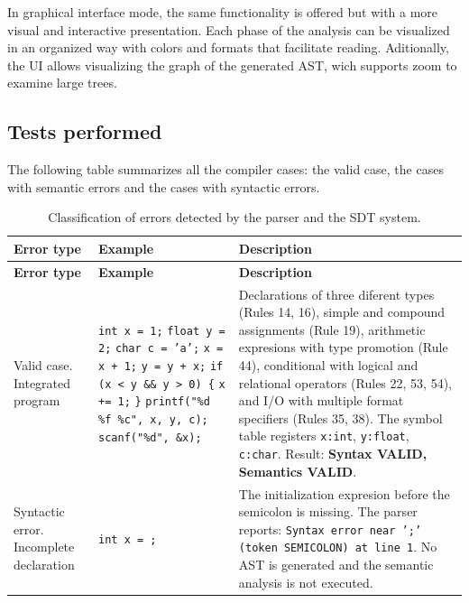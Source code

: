 \documentclass[letterpaper,12pt,oneside]{article}
\begin{document}
In graphical interface mode, the same functionality is offered but with a more visual and interactive presentation. Each phase of the analysis can be visualized in an organized way with colors and formats that facilitate reading. Aditionally, the UI allows visualizing the graph of the generated AST, wich supports zoom to examine large trees.

\subsection{Tests performed}

The following table summarizes all the compiler cases: the valid case, the cases with semantic errors and the cases with syntactic errors.

\begin{longtable}{|p{3.8cm}|p{3.5cm}|p{6.5cm}|}
\caption{Classification of errors detected by the parser and the SDT system.} \label{tab:errores} \\
\hline
\rowcolor{gray!20}
\textbf{Error type} & \textbf{Example} & \textbf{Description} \\
\hline
\endfirsthead
\hline
\rowcolor{gray!20}
\textbf{Error type} & \textbf{Example} & \textbf{Description} \\
\hline
\endhead
Valid case. Integrated program &
\texttt{int x = 1;} \newline \texttt{float y = 2;} \newline \texttt{char c = 'a';} \newline \texttt{x = x + 1;} \newline \texttt{y = y + x;} \newline \texttt{if (x < y \&\& y > 0) \{} \newline \texttt{\quad x += 1;} \newline \texttt{\}} \newline \texttt{printf("\%d \%f \%c", x, y, c);} \newline \texttt{scanf("\%d", \&x);} &
Declarations of three diferent types (Rules 14, 16), simple and compound assignments (Rule 19), arithmetic expresions with type promotion (Rule 44), conditional with logical and relational operators (Rules 22, 53, 54), and I/O with multiple format specifiers (Rules 35, 38). The symbol table registers \texttt{x:int}, \texttt{y:float}, \texttt{c:char}. Result: \textbf{Syntax VALID, Semantics VALID}. \\
\hline
Syntactic error. Incomplete declaration &
\texttt{int x = ;} &
The initialization expresion before the semicolon is missing. The parser reports: \texttt{Syntax error near ';' (token SEMICOLON) at line 1}. No AST is generated and the semantic analysis is not executed. \\

\end{longtable}
\end{document}

